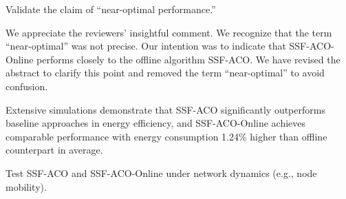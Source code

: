 \begin{metacomment}
	Validate the claim of ``near-optimal performance.''
\end{metacomment}
\begin{metaresponse}%
	We appreciate the reviewers' insightful comment.
	We recognize that the term ``near-optimal'' was not precise. Our intention was to indicate that SSF-ACO-Online performs closely to the offline algorithm SSF-ACO. We have revised the abstract to clarify this point and removed the term ``near-optimal'' to avoid confusion.
	\begin{changes}
		Extensive simulations demonstrate that SSF-ACO significantly outperforms baseline approaches in energy efficiency, and SSF-ACO-Online achieves comparable performance with energy consumption 1.24\% higher than offline counterpart in average.
	\end{changes}
\end{metaresponse}

\begin{metacomment}
	Test SSF-ACO and SSF-ACO-Online under network dynamics (e.g., node mobility).
\end{metacomment}
\begin{metaresponse}%
	
\end{metaresponse}

